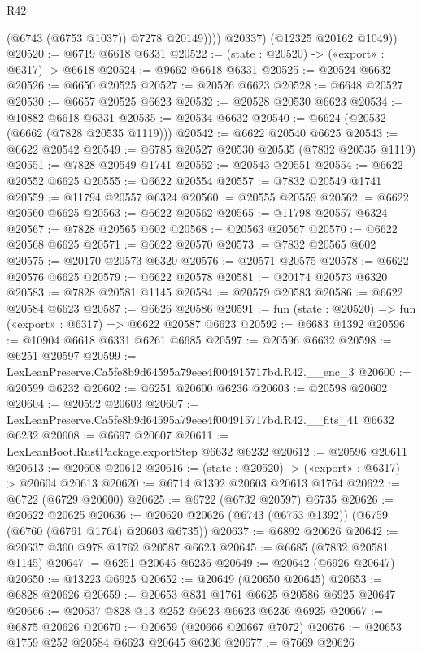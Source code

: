 \begin{lexlean}{R42}
\begin{coremodule}
{                (@6743 (@6753 @1037))
                @7278
                @20149))))
        @20337)
      (@12325 @20162 @1049))
@20520 := @6719 @6618 @6331
@20522 := (state : @20520) -> («export» : @6317) -> @6618
@20524 := @9662 @6618 @6331
@20525 := @20524 @6632
@20526 := @6650 @20525
@20527 := @20526 @6623
@20528 := @6648 @20527
@20530 := @6657 @20525 @6623
@20532 := @20528 @20530 @6623
@20534 := @10882 @6618 @6331
@20535 := @20534 @6632
@20540 := @6624 (@20532 (@6662 (@7828 @20535 @1119)))
@20542 := @6622 @20540 @6625
@20543 := @6622 @20542
@20549 := @6785 @20527 @20530 @20535 (@7832 @20535 @1119)
@20551 := @7828 @20549 @1741
@20552 := @20543 @20551
@20554 := @6622 @20552 @6625
@20555 := @6622 @20554
@20557 := @7832 @20549 @1741
@20559 := @11794 @20557 @6324
@20560 := @20555 @20559
@20562 := @6622 @20560 @6625
@20563 := @6622 @20562
@20565 := @11798 @20557 @6324
@20567 := @7828 @20565 @602
@20568 := @20563 @20567
@20570 := @6622 @20568 @6625
@20571 := @6622 @20570
@20573 := @7832 @20565 @602
@20575 := @20170 @20573 @6320
@20576 := @20571 @20575
@20578 := @6622 @20576 @6625
@20579 := @6622 @20578
@20581 := @20174 @20573 @6320
@20583 := @7828 @20581 @1145
@20584 := @20579 @20583
@20586 := @6622 @20584 @6623
@20587 := @6626 @20586
@20591 := fun (state : @20520) => fun («export» : @6317) => @6622 @20587 @6623
@20592 := @6683 @1392
@20596 := @10904 @6618 @6331 @6261 @6685
@20597 := @20596 @6632
@20598 := @6251 @20597
@20599 := LexLeanPreserve.Ca5fe8b9d64595a79eee4f004915717bd.R42.__enc_3
@20600 := @20599 @6232
@20602 := @6251 @20600 @6236
@20603 := @20598 @20602
@20604 := @20592 @20603
@20607 := LexLeanPreserve.Ca5fe8b9d64595a79eee4f004915717bd.R42.__fits_41 @6632 @6232
@20608 := @6697 @20607
@20611 := LexLeanBoot.RustPackage.exportStep @6632 @6232
@20612 := @20596 @20611
@20613 := @20608 @20612
@20616 := (state : @20520) -> («export» : @6317) -> @20604 @20613
@20620 := @6714 @1392 @20603 @20613 @1764
@20622 := @6722 (@6729 @20600)
@20625 := @6722 (@6732 @20597) @6735
@20626 := @20622 @20625
@20636 := @20620 @20626 (@6743 (@6753 @1392)) (@6759 (@6760 (@6761 @1764) @20603 @6735))
@20637 := @6892 @20626
@20642 := @20637 @360 @978 @1762 @20587 @6623
@20645 := @6685 (@7832 @20581 @1145)
@20647 := @6251 @20645 @6236
@20649 := @20642 (@6926 @20647)
@20650 := @13223 @6925
@20652 := @20649 (@20650 @20645)
@20653 := @6828 @20626
@20659 := @20653 @831 @1761 @6625 @20586 @6925 @20647
@20666 := @20637 @828 @13 @252 @6623 @6623 @6236 @6925
@20667 := @6875 @20626
@20670 := @20659 (@20666 @20667 @7072)
@20676 := @20653 @1759 @252 @20584 @6623 @20645 @6236
@20677 := @7669 @20626
}
\end{coremodule}
\end{lexlean}
